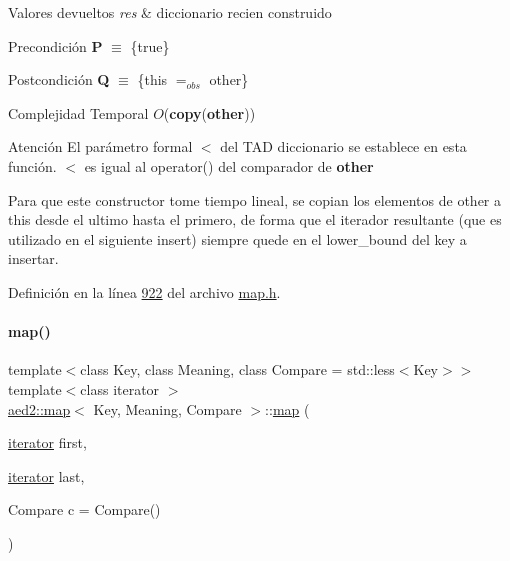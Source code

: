 \begin{DoxyRetVals}{Valores devueltos}
{\em res} & diccionario recien construido\\
\hline
\end{DoxyRetVals}
\begin{DoxyPrecond}{Precondición}
{\bfseries P} $\equiv$ \{true\} 
\end{DoxyPrecond}
\begin{DoxyPostcond}{Postcondición}
{\bfseries Q} $\equiv$ \{this $=_{obs}$ other\}
\end{DoxyPostcond}

\begin{DoxyDescription}
\item[Complejidad Temporal]$O$({\bfseries copy}({\bfseries other}))
\end{DoxyDescription}

\begin{DoxyAttention}{Atención}
El parámetro formal $<$ del T\+AD diccionario se establece en esta función. $<$ es igual al operator() del comparador de {\bfseries other}
\end{DoxyAttention}
Para que este constructor tome tiempo lineal, se copian los elementos de other a this desde el ultimo hasta el primero, de forma que el iterador resultante (que es utilizado en el siguiente insert) siempre quede en el lower\+\_\+bound del key a insertar. 

Definición en la línea \hyperlink{map_8h_source_l00922}{922} del archivo \hyperlink{map_8h_source}{map.\+h}.

\mbox{\label{classaed2_1_1map_a5d336f3248572beb56be383dcc95cfeb_a5d336f3248572beb56be383dcc95cfeb}} 
\paragraph{\texorpdfstring{map()}{map()}\hspace{0.1cm}{\footnotesize\ttfamily [3/3]}}
{\footnotesize\ttfamily template$<$class Key, class Meaning, class Compare = std\+::less$<$\+Key$>$$>$ \\
template$<$class iterator $>$ \\
\hyperlink{classaed2_1_1map}{aed2\+::map}$<$ Key, Meaning, Compare $>$\+::\hyperlink{classaed2_1_1map}{map} (\begin{DoxyParamCaption}\item[{\hyperlink{classaed2_1_1map_1_1iterator}{iterator}}]{first,  }\item[{\hyperlink{classaed2_1_1map_1_1iterator}{iterator}}]{last,  }\item[{Compare}]{c = {\ttfamily Compare()} }\end{DoxyParamCaption})\hspace{0.3cm}{\ttfamily [inline]}}



